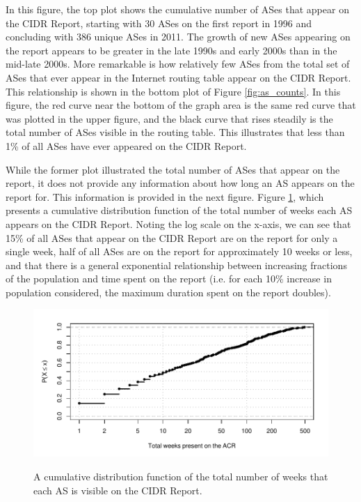 In this figure, the top plot shows the cumulative number of ASes that appear on
the CIDR Report, starting with 30 ASes on the first report in 1996 and
concluding with 386 unique ASes in 2011. The growth of new ASes appearing on
the report appears to be greater in the late 1990s and early 2000s than in the
mid-late 2000s. More remarkable is how relatively few ASes from the total set
of ASes that ever appear in the Internet routing table appear on the CIDR
Report. This relationship is shown in the bottom plot of Figure
\ref{fig:as_counts}. In this figure, the red curve near the bottom of the graph
area is the same red curve that was plotted in the upper figure, and the black
curve that rises steadily is the total number of ASes visible in the routing
table. This illustrates that less than 1\% of all ASes have ever appeared on
the CIDR Report.

While the former plot illustrated the total number of ASes that appear on the
report, it does not provide any information about how long an AS appears on the
report for. This information is provided in the next figure. Figure
\ref{fig:cdf_weeks}, which presents a cumulative distribution function of the
total number of weeks each AS appears on the CIDR Report. Noting the log scale
on the x-axis, we can see that 15\% of all ASes that appear on the CIDR Report
are on the report for only a single week, half of all ASes are on the report
for approximately 10 weeks or less, and that there is a general exponential
relationship between increasing fractions of the population and time spent
on the report (i.e. for each 10\% increase in population considered, the
maximum duration spent on the report doubles).

\begin{figure}[h!]
\begin{centering}
\begin{singlespace}
    \includegraphics[width=6in]{figures/acr_cdf_weeks.pdf}
    \vspace{-2em}\\
    \caption{A cumulative distribution function of the total number of weeks
        that each AS is visible on the CIDR Report.}
    \label{fig:cdf_weeks}
\end{singlespace}
\end{centering}
\end{figure}


